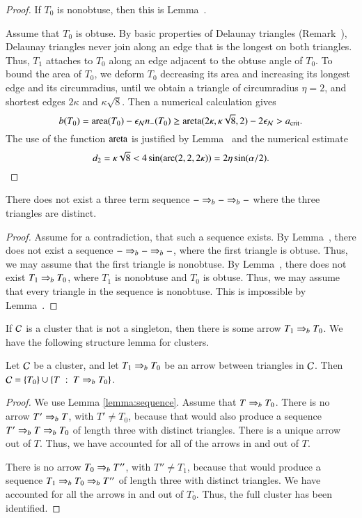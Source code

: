 \begin{proof}  
  If $T_0$ is nonobtuse, then this is Lemma~.

Assume that $T_0$ is obtuse.  By basic properties of Delaunay
triangles (Remark~), Delaunay triangles never join
along an edge that is the longest on both triangles.  Thus, $T_1$
attaches to $T_0$ along an edge adjacent to the obtuse angle of $T_0$.
To bound the area of $T_0$, we deform $T_0$ decreasing its area and
increasing its longest edge and its circumradius, until we obtain a
triangle of circumradius $\eta=2$, and shortest edges $2\kappa$ and
$\kappa\sqrt{8}$.  Then a numerical calculation gives
\[
b(T_0) = {\operatorname{area}}(T_0) - \epsilon_{\mathcal N} n_-(T_0) \ge 
{\operatorname{areta}}(2\kappa,\kappa\sqrt{8},2) - 2\epsilon_{\mathcal N} > a_\text{crit}.
\] %
The use of the function ${\operatorname{areta}}$ is justified by
Lemma~ and the numerical estimate
\[
d_2 = \kappa\sqrt8 
<  4 \sin(\operatorname{arc}(2,2,2\kappa)) = 2\eta\sin(\alpha/2).
\] %
\end{proof}


\begin{lemma}  There does not exist a three
  term sequence $- \Rightarrow_{b} -\Rightarrow_{b} -$ where the three triangles are
  distinct.
\end{lemma}

\begin{proof}  
  Assume for a contradiction, that such a sequence exists.  By
  Lemma~, there does not exist a sequence $- \Rightarrow_{b} -
  \Rightarrow_{b} -$, where the first triangle is obtuse.  Thus, we may assume
  that the first triangle is nonobtuse.  By Lemma~,
  there does not exist $T_1\Rightarrow_{b} T_0$, where $T_1$ is nonobtuse and
  $T_0$ is obtuse.  Thus, we may assume that every triangle in the
  sequence is nonobtuse.  This is impossible by
  Lemma~.
\end{proof}

If $\mathcal C$ is a cluster that is not a singleton, then there is
some arrow $T_1\Rightarrow_{b} T_0$.  We have the following structure
lemma for clusters.

\begin{lemma}
  Let $\mathcal C$ be a cluster, and let $T_1\Rightarrow_{b} T_0$ be an
  arrow between triangles in $\mathcal C$.
  Then $\mathcal C = \{T_0\}\cup \{T \ :\  T\Rightarrow_{b} T_0\}$.
\end{lemma}

\begin{proof}  
  We use Lemma \ref{lemma:sequence}.  Assume that $T\Rightarrow_{b} T_0$.  There
  is no arrow $T'\Rightarrow_{b} T$, with $T'\ne T_0$, because that would also
  produce a sequence $T' \Rightarrow_{b} T \Rightarrow_{b} T_0$ of length three with
  distinct triangles.  There is a unique arrow out of $T$.  Thus, we
  have accounted for all of the arrows in and out of $T$.

  There is no arrow $T_0\Rightarrow_{b} T''$, with $T''\ne T_1$, because that
  would produce a sequence $T_1\Rightarrow_{b} T_0\Rightarrow_{b} T''$ of length three with
  distinct triangles.  We have accounted for all the arrows in and
  out of $T_0$.  Thus, the full cluster has been identified.
\end{proof}

